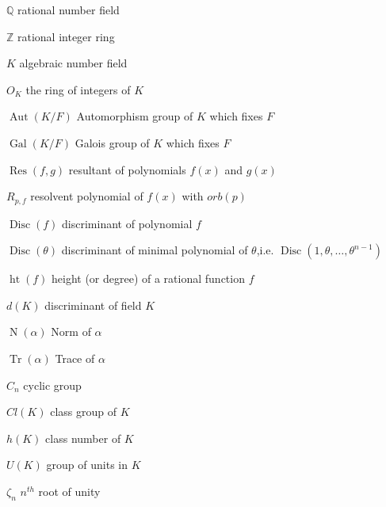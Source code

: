 \begin{denotation}
\item[$\mathbb{Q}$] rational number field
\item[$\mathbb{Z}$] rational integer ring
\item[$K$] algebraic number field
\item[$O_K$] the ring of integers of $K$
\item[$\operatorname{Aut}(K/F)$] Automorphism group of $K$ which fixes $F$
\item[$\operatorname{Gal}(K/F)$] Galois group of $K$ which fixes $F$
\item[$\operatorname{Res}(f,g)$] resultant of polynomials $f(x)$ and $g(x)$
\item[$R_{p,f}$] resolvent polynomial of $f(x)$ with $orb(p)$
\item[$\operatorname{Disc}(f)$] discriminant of polynomial $f$
\item[$\operatorname{Disc}(\theta)$] discriminant of minimal polynomial of $\theta$,i.e. $\operatorname{Disc}(1,\theta,\dots,\theta^{n-1})$
\item[$\operatorname{ht}(f)$] height (or degree) of a rational function $f$
\item[$d(K)$] discriminant of field $K$
\item[$\operatorname{N}(\alpha)$] Norm of $\alpha$
\item[$\operatorname{Tr}(\alpha)$] Trace of $\alpha$
\item[$C_n$] cyclic group
\item[$Cl(K)$] class group of $K$
\item[$h(K)$] class number of $K$
\item[$U(K)$] group of units in $K$
\item[$\zeta_n$] $n^{th}$ root of unity

\end{denotation}
